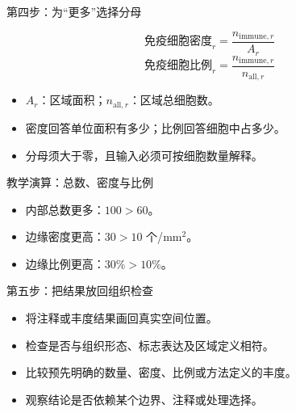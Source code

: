 \begin{frame}{第四步：为“更多”选择分母}\relax

\[
\text{免疫细胞密度}_r=\frac{n_{\mathrm{immune},r}}{A_r}
\]
\[
\text{免疫细胞比例}_r=\frac{n_{\mathrm{immune},r}}{n_{\mathrm{all},r}}
\]
\begin{itemize}\wideitems
\item $A_r$：区域面积；$n_{\mathrm{all},r}$：区域总细胞数。
\item 密度回答单位面积有多少；比例回答细胞中占多少。
\item 分母须大于零，且输入必须可按细胞数量解释。
\end{itemize}
\end{frame}

\begin{frame}{教学演算：总数、密度与比例}\relax
\par{}

\vspace{4mm}
\begin{itemize}\compactitems
  \item 内部总数更多：$100>60$。
  \item 边缘密度更高：$30>10$ 个/$\mathrm{mm}^2$。
  \item 边缘比例更高：$30\%>10\%$。
\end{itemize}

\end{frame}

\begin{frame}{第五步：把结果放回组织检查}\relax
\begin{itemize}\wideitems
\item 将注释或丰度结果画回真实空间位置。
\item 检查是否与组织形态、标志表达及区域定义相符。
\item 比较预先明确的数量、密度、比例或方法定义的丰度。
\item 观察结论是否依赖某个边界、注释或处理选择。
\end{itemize}
\end{frame}

